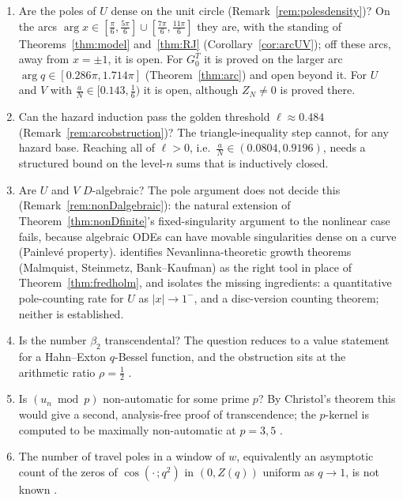 \documentclass[11pt]{article}
\theoremstyle{plain}
\theoremstyle{definition}
\theoremstyle{remark}
\theoremstyle{plain}\newtheorem*{maintheorem}{Main Theorem}
\begin{document}
\begin{enumerate}[label=\textup{(\arabic*)},leftmargin=2.2em,itemsep=0.1em,topsep=0.2em]
\item Are the poles of $U$ dense on the unit circle (Remark~\ref{rem:polesdensity})? On the arcs
$\arg x\in[\frac\pi6,\frac{5\pi}6]\cup[\frac{7\pi}6,\frac{11\pi}6]$ they are, with the standing of
Theorems~\ref{thm:model} and~\ref{thm:RJ} (Corollary~\ref{cor:arcUV}); off these arcs, away from $x=\pm1$,
it is open. For $G^T_0$ it is proved on the larger arc $\arg q\in[0.286\pi,1.714\pi]$ (Theorem~\ref{thm:arc}) and open beyond it.
For $U$ and $V$ with $\frac aN\in[0.143,\frac16)$ it is open, although $Z_N\ne0$ is proved there.
\item Can the hazard induction pass the golden threshold $\ell\approx0.484$ (Remark~\ref{rem:arcobstruction})? The
triangle-inequality step cannot, for any hazard base. Reaching all of $\ell>0$, i.e.\ $\frac aN\in(0.0804,0.9196)$, needs
a structured bound on the level-$n$ sums that is inductively closed.
\item Are $U$ and $V$ $D$-algebraic? The pole argument does not decide this
(Remark~\ref{rem:nonDalgebraic}): the natural extension of Theorem~\ref{thm:nonDfinite}'s
fixed-singularity argument to the nonlinear case fails, because algebraic ODEs can have movable
singularities dense on a curve (Painlev\'e property). \cite{Bonfioli2026P4} identifies
Nevanlinna-theoretic growth theorems (Malmquist, Steinmetz, Bank--Kaufman) as the right tool in
place of Theorem~\ref{thm:fredholm}, and isolates the missing ingredients: a quantitative
pole-counting rate for $U$ as $|x|\to1^-$, and a disc-version counting theorem; neither is
established.
\item Is the number $\beta_2$ transcendental? The question reduces to a value statement for a
Hahn--Exton $q$-Bessel function, and the obstruction sits at the arithmetic ratio $\rho=\tfrac12$
\cite[Appendix \textup{app:beta2}]{Bonfioli2026bB}.
\item Is $(u_n\bmod p)$ non-automatic for some prime $p$? By Christol's theorem this would give a
second, analysis-free proof of transcendence; the $p$-kernel is computed to be maximally
non-automatic at $p=3,5$ \cite[\S\,\textup{sec:modp}]{Bonfioli2026bB}.
\item The number of travel poles in a window of $w$, equivalently an asymptotic count of the zeros
of $\cos(\cdot\,;q^2)$ in $(0,Z(q))$ uniform as $q\to1$, is not known
\cite[Remark ``what the known theory does not give'', \textup{rem:knowntheory}]{Bonfioli2026bB}.
\end{enumerate}
\end{document}
